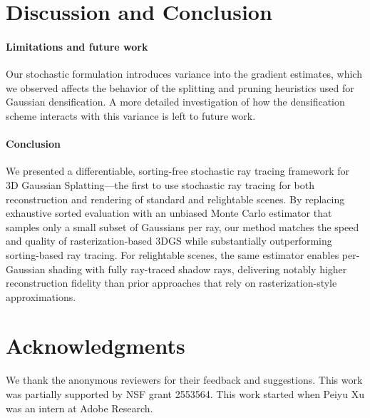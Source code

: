 \section{Discussion and Conclusion}
\label{sec:conclusion}
%
\paragraph{Limitations and future work}
Our stochastic formulation introduces variance into the gradient estimates, which we observed affects the behavior of the splitting and pruning heuristics used for Gaussian densification. A more detailed investigation of how the densification scheme interacts with this variance is left to future work.

\paragraph{Conclusion}
We presented a differentiable, sorting-free stochastic ray tracing framework for 3D Gaussian Splatting---the first to use stochastic ray tracing for both reconstruction and rendering of standard and relightable scenes.
By replacing exhaustive sorted evaluation with an unbiased Monte Carlo estimator that samples only a small subset of Gaussians per ray, our method matches the speed and quality of rasterization-based 3DGS while substantially outperforming sorting-based ray tracing.
For relightable scenes, the same estimator enables per-Gaussian shading with fully ray-traced shadow rays, delivering notably higher reconstruction fidelity than prior approaches that rely on rasterization-style approximations.

\section*{Acknowledgments}
We thank the anonymous reviewers for their feedback and suggestions.
This work was partially supported by NSF grant 2553564. This work started when Peiyu Xu was an intern at Adobe Research.
